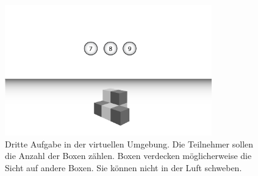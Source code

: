 \begin{figure}[H]
	\centering
	\includegraphics[width=0.8\textwidth]{./images/counting_abstract.png}
	\caption{Dritte Aufgabe in der virtuellen Umgebung. Die Teilnehmer sollen die Anzahl der Boxen zählen. Boxen verdecken möglicherweise die Sicht auf andere Boxen. Sie können nicht in der Luft schweben.}
	\label{fig:counting_abstract}
\end{figure}
